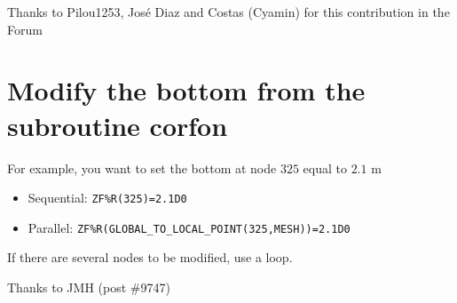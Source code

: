  
{\footnotesize Thanks to Pilou1253, Jos\'e Diaz and Costas (Cyamin) for this contribution in the Forum}

\section{Modify the bottom from the subroutine corfon}
For example, you want to set the bottom at node $325$ equal to $2.1$ m
\begin{itemize}
\item Sequential: \texttt{ZF\%R(325)=2.1D0}
\item Parallel: \texttt{ZF\%R(GLOBAL\_TO\_LOCAL\_POINT(325,MESH))=2.1D0}
\end{itemize}

If there are several nodes to be modified, use a loop.

{\footnotesize Thanks to JMH (post \#9747)}
